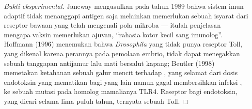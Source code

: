 \begin{proof}[Bukti eksperimental]
Janeway mengusulkan pada tahun 1989 bahwa sistem imun adaptif tidak
menanggapi antigen saja melainkan memerlukan sebuah isyarat dari reseptor bawaan
yang telah mengenali pola mikroba --- itulah penjelasan mengapa vaksin
memerlukan ajuvan, ``rahasia kotor kecil sang imunolog''. Hoffmann
(1996) menemukan bahwa \emph{Drosophila} yang tidak punya reseptor Toll, yang
dikenal karena perannya pada pemolaan embrio, tidak dapat menegakkan sebuah
tanggapan antijamur lalu mati bersalut kapang; Beutler (1998) memetakan
ketahanan sebuah galur mencit terhadap , yang selamat dari dosis
endotoksin yang mematikan bagi yang lain namun gagal membersihkan infeksi
, ke sebuah mutasi pada homolog mamalianya TLR4. Reseptor
bagi endotoksin, yang dicari selama lima puluh tahun, ternyata sebuah Toll.
\end{proof}

